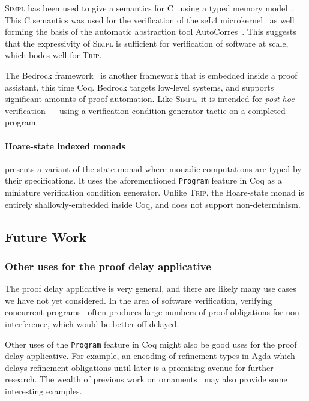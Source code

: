 \documentclass[sigplan]{acmart}%
\begin{document}
\textsc{Simpl} has been used to give a semantics for C~\citep{csem} using a 
typed memory model~\citep{cmem}. This C semantics was used for the verification 
of the seL4 microkernel~\citep{sel4} as well forming the basis of the automatic 
abstraction tool AutoCorres~\citep{autocorres1, autocorres2}.  This suggests that the 
expressivity of \textsc{Simpl} is sufficient for verification of software at scale,
which bodes well for \textsc{Trip}.

The Bedrock framework~\citep{bedrock} is another framework that is embedded 
inside a proof assistant, this time Coq. Bedrock targets low-level systems, 
and supports significant amounts of proof automation. Like \textsc{Simpl}, it
is intended for \emph{post-hoc} verification --- using a verification condition
generator tactic on a completed program.

\paragraph{Hoare-state indexed monads}
\citet{Swierstra} presents a variant of the state monad where monadic 
computations are typed by their specifications. It uses the aforementioned 
\texttt{Program} feature in Coq as a miniature verification condition generator.
Unlike \textsc{Trip}, the Hoare-state monad is entirely shallowly-embedded inside
Coq, and does not support non-determinism.


\subsection{Future Work}\label{subsec:futurework}

\subsubsection{Other uses for the proof delay applicative}
The proof delay applicative is very general, and there are likely many use 
cases we have not yet considered. In the area of software verification,  
verifying concurrent programs~\citep{owickigries} often produces large numbers of proof obligations for 
non-interference, which would be better off delayed. 

Other uses of the \texttt{Program} feature in Coq might also be good uses for 
the proof delay applicative. For example, an encoding of refinement types
in Agda which delays refinement obligations until later is a promising 
avenue for further research. The wealth of previous work on 
ornaments~\citep{ornaments1,ornaments2,ornaments3,ornaments4,ornaments5} may also provide 
some interesting examples.
\end{document}
